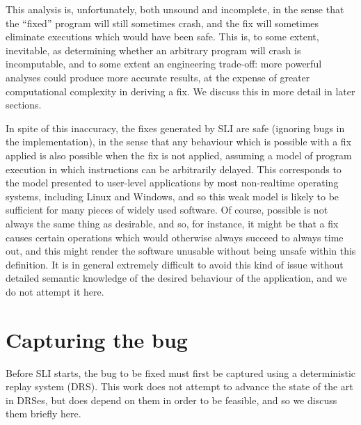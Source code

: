 \documentclass[10pt,twocolumn,preprint,natbib,authoryear]{sigplanconf}
\begin{document}
This analysis is, unfortunately, both unsound and incomplete, in the
sense that the ``fixed'' program will still sometimes crash, and the
fix will sometimes eliminate executions which would have been safe.
This is, to some extent, inevitable, as determining whether an
arbitrary program will crash is incomputable, and to some extent an
engineering trade-off: more powerful analyses could produce more
accurate results, at the expense of greater computational complexity
in deriving a fix.  We discuss this in more detail in later sections.

In spite of this inaccuracy, the fixes generated by SLI are safe
(ignoring bugs in the implementation), in the sense that any behaviour
which is possible with a fix applied is also possible when the fix is
not applied, assuming a model of program execution in which
instructions can be arbitrarily delayed.  This corresponds to the
model presented to user-level applications by most non-realtime
operating systems, including Linux and Windows, and so this weak model
is likely to be sufficient for many pieces of widely used software.
Of course, possible is not always the same thing as desirable, and so,
for instance, it might be that a fix causes certain operations which
would otherwise always succeed to always time out, and this might
render the software unusable without being unsafe within this
definition.  It is in general extremely difficult to avoid this kind
of issue without detailed semantic knowledge of the desired behaviour
of the application, and we do not attempt it here.

\section{Capturing the bug}

Before SLI starts, the bug to be fixed must first be captured using a
deterministic replay system (DRS).  This work does not attempt to
advance the state of the art in DRSes, but does depend on them in
order to be feasible, and so we discuss them briefly here.
\end{document}
